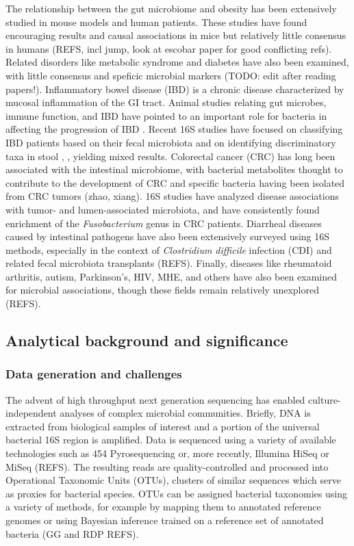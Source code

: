 \documentclass[12pt]{article}
\begin{document}
The relationship between the gut microbiome and obesity has been 
extensively studied in mouse models and human patients. These studies
have found encouraging results and causal associations in mice but 
relatively little consensus in humans (REFS, incl jump, look at escobar 
paper for good conflicting refs). Related disorders like metabolic 
syndrome and diabetes have also been examined, with little consensus and 
speficic microbial markers (TODO: edit after reading papers!). 
Inflammatory bowel disease (IBD) is a chronic disease characterized by 
mucosal inflammation of the GI tract. Animal studies relating gut 
microbes, immune function, and IBD have pointed to an important role for 
bacteria in affecting the progression of IBD \cite{tamboli-ibd-2004}. 
Recent 16S studies have focused on classifying IBD patients based on 
their fecal microbiota and on identifying discriminatory taxa in stool \cite{papa}, \cite{gevers}, yielding mixed results. 
Colorectal cancer (CRC) has long been associated with the intestinal 
microbiome, with bacterial metabolites thought to contribute to the 
development of CRC and specific bacteria having been isolated from CRC 
tumors (zhao, xiang). 16S studies have analyzed disease associations with 
tumor- and lumen-associated microbiota, and have consistently found 
enrichment of the \textit{Fusobacterium} genus in CRC patients. Diarrheal 
diseases caused by intestinal pathogens have also been extensively 
surveyed using 16S methods, especially in the context of 
\textit{Clostridium difficile} infection (CDI) and related fecal 
microbiota transplants (REFS). Finally, diseases like rheumatoid 
arthritis, autism, Parkinson's, HIV, MHE, and others have also been 
examined for microbial associations, though these fields remain 
relatively unexplored (REFS).

\subsection{Analytical background and significance}

\subsubsection{Data generation and challenges}
The advent of high throughput next generation sequencing has enabled 
culture-independent analyses of complex microbial communities. 
Briefly, DNA is extracted from biological samples of interest and a 
portion of the universal bacterial 16S region is amplified. Data is 
sequenced using a variety of available technologies such as 454 
Pyrosequencing or, more recently, Illumina HiSeq or MiSeq (REFS). The 
resulting reads are quality-controlled and processed into Operational 
Taxonomic Units (OTUs), clusters of similar sequences which serve as 
proxies for bacterial species. OTUs can be assigned bacterial 
taxonomies using a variety of methods, for example by mapping them to 
annotated reference genomes or using Bayesian inference trained on a 
reference set of annotated bacteria (GG and RDP REFS). 
\end{document}
